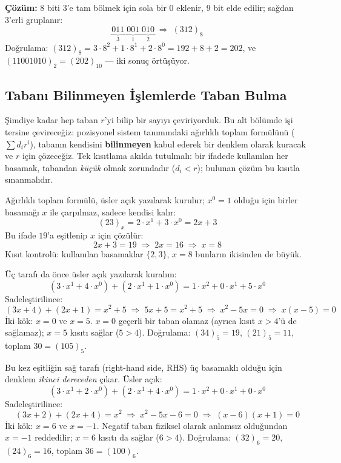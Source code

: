 \noindent\textbf{Çözüm:} 8 biti 3'e tam bölmek için sola bir $0$ eklenir, 9 bit elde edilir;
sağdan 3'erli gruplanır:
\[
\underbrace{011}_{3} \; \underbrace{001}_{1} \; \underbrace{010}_{2} \;\Rightarrow\; (312)_8
\]
Doğrulama: $(312)_8 = 3\cdot8^2+1\cdot8^1+2\cdot8^0 = 192+8+2=202$, ve
$(11001010)_2=(202)_{10}$ --- iki sonuç örtüşüyor.

\subsection{Tabanı Bilinmeyen İşlemlerde Taban Bulma}
\label{sec:bilinmeyen-taban}

Şimdiye kadar hep taban $r$'yi bilip bir sayıyı çeviriyorduk. Bu alt bölümde işi tersine
çevireceğiz: pozisyonel sistem tanımındaki ağırlıklı toplam formülünü ($\sum d_i r^i$),
tabanın kendisini \textbf{bilinmeyen} kabul ederek bir denklem olarak kuracak ve $r$ için
çözeceğiz. Tek kısıtlama akılda tutulmalı: bir ifadede kullanılan her basamak, tabandan
\emph{küçük} olmak zorundadır ($d_i < r$); bulunan çözüm bu kısıtla sınanmalıdır.

\begin{ornek}
Ağırlıklı toplam formülü, üsler açık yazılarak kurulur; $x^0=1$ olduğu için birler basamağı
$x$ ile çarpılmaz, sadece kendisi kalır:
\[
(23)_x = 2\cdot x^1+3\cdot x^0 = 2x+3
\]
Bu ifade $19$'a eşitlenip $x$ için çözülür:
\[
2x+3=19 \;\Rightarrow\; 2x=16 \;\Rightarrow\; x=8
\]
Kısıt kontrolü: kullanılan basamaklar $\{2,3\}$, $x=8$ bunların ikisinden de büyük. \checkmark
\end{ornek}

\begin{ornek}[$(34)_x+(21)_x=(105)_x$ İse $x$ Nedir?]
Üç tarafı da önce üsler açık yazılarak kuralım:
\[
(3\cdot x^1+4\cdot x^0)+(2\cdot x^1+1\cdot x^0) = 1\cdot x^2+0\cdot x^1+5\cdot x^0
\]
Sadeleştirilince:
\[
(3x+4)+(2x+1) = x^2+5 \;\Rightarrow\; 5x+5 = x^2+5 \;\Rightarrow\; x^2-5x=0
\;\Rightarrow\; x(x-5)=0
\]
İki kök: $x=0$ ve $x=5$. $x=0$ geçerli bir taban olamaz (ayrıca kısıt $x>4$'ü de sağlamaz);
$x=5$ kısıtı sağlar ($5>4$). \checkmark Doğrulama: $(34)_5{=}19$, $(21)_5{=}11$, toplam
$30=(105)_5$.
\end{ornek}

\begin{ornek}[$(32)_x+(24)_x=(100)_x$ İse $x$ Nedir?]
Bu kez eşitliğin sağ tarafı (right-hand side, RHS) üç basamaklı olduğu için denklem
\emph{ikinci dereceden} çıkar. Üsler açık:
\[
(3\cdot x^1+2\cdot x^0)+(2\cdot x^1+4\cdot x^0) = 1\cdot x^2+0\cdot x^1+0\cdot x^0
\]
Sadeleştirilince:
\[
(3x+2)+(2x+4) = x^2 \;\Rightarrow\; x^2-5x-6=0 \;\Rightarrow\; (x-6)(x+1)=0
\]
İki kök: $x=6$ ve $x=-1$. Negatif taban fiziksel olarak anlamsız olduğundan $x=-1$ reddedilir;
$x=6$ kısıtı da sağlar ($6>4$). \checkmark Doğrulama: $(32)_6{=}20$, $(24)_6{=}16$, toplam
$36=(100)_6$.
\end{ornek}

